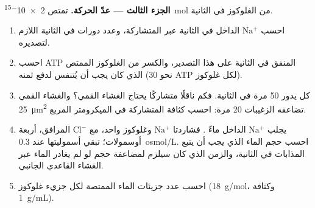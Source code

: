 \begin{problem}
\medskip
\noindent\textbf{الجزء الثالث --- عدّ الحركة.}
تمتص  \qty{2e-15}{mol} من الغلوكوز في الثانية.
\begin{enumerate}[resume]
  \item احسب $\mathrm{Na^+}$ الداخل في الثانية عبر  المتشاركة،
        وعدد دورات  في الثانية اللازم لتصديره.
  \item احسب ATP المنفق في الثانية على هذا التصدير، والكسر من
        الغلوكوز الممتص الذي كان يجب أن يُتنفس لدفع ثمنه (نحو 30 ATP
        لكل غلوكوز).
  \item كل  يدور \qty{50}{} مرة في الثانية. فكم ناقلًا
        متشاركًا يحتاج الغشاء القمي؟ والغشاء القمي \qty{25}{\micro m^2}
        تضاعفه الزغيبات \qty{20}{} مرة: احسب كثافة  المتشاركة
        في الميكرومتر المربع.
  \item يجلب $\mathrm{Na^+}$ الداخل ماءً . فشاردتا
        $\mathrm{Na^+}$ وغلوكوز واحد، مع $\mathrm{Cl^-}$ المرافق،
        أربعة أوسمولات؛  تبقي أسموليتها عند
        \qty{0.3}{osmol/L}. احسب حجم الماء الذي يجب أن يتبع المذابات
        في الثانية، والزمن الذي كان سيلزم لمضاعفة حجم  لو لم
        يغادر الماء عبر الغشاء القاعدي الجانبي.
  \item احسب عدد جزيئات الماء الممتصة لكل جزيء غلوكوز
        (\qty{18}{g/mol}، وكثافة \qty{1}{g/mL}).
\end{enumerate}


\end{problem}
